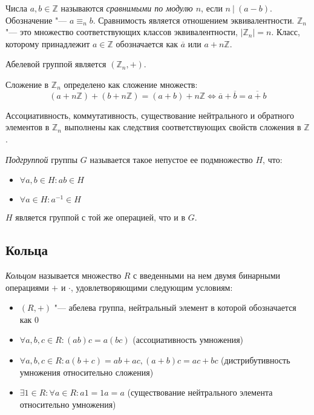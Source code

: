 \begin{definition}
	Числа $a, b \in \mathbb{Z}$ называются \textit{сравнимыми по модулю $n$}, если $n~|~(a - b)$. Обозначение "--- $a \equiv_n b$. Сравнимость является отношением эквивалентности. $\mathbb{Z}_n$ "--- это множество соответствующих классов эквивалентности, $|\mathbb{Z}_n| = n$. Класс, которому принадлежит $a \in \mathbb{Z}$ обозначается как $\overline{a}$ или $a + n\mathbb{Z}$.
\end{definition}

\begin{example}
	Абелевой группой является $(\mathbb{Z}_n, +)$.
	
	Сложение в $\mathbb{Z}_n$ определено как сложение множеств:
	\[(a + n\mathbb{Z}) + (b + n\mathbb{Z}) = (a + b) + n\mathbb{Z} \Leftrightarrow \overline{a} + \overline{b} = \overline{a + b}\]
	
	Ассоциативность, коммутативность, существование нейтрального и обратного элементов в $\mathbb{Z}_n$ выполнены как следствия соответствующих свойств сложения в $\mathbb{Z}$.
\end{example}

\begin{definition}
	\textit{Подгруппой} группы $G$ называется такое непустое ее подмножество $H$, что:
	\begin{itemize}
		\item $\forall a, b \in H: ab \in H$
		\item $\forall a \in H : a^{-1} \in H$
	\end{itemize}
	
	$H$ является группой с той же операцией, что и в $G$.
\end{definition}

\subsection{Кольца}

\begin{definition}
	\textit{Кольцом} называется множество $R$ с введенными на нем двумя бинарными операциями $+$ и $\cdot$, удовлетворяющими следующим условиям:
	\begin{itemize}
		\item $(R, +)$ "--- абелева группа, нейтральный элемент в которой обозначается как $0$
		\item $\forall a, b, c \in R: (ab)c = a(bc)$ (ассоциативность умножения)
		\item $\forall a, b, c \in R: a(b + c) = ab + ac, (a + b)c = ac + bc$ (дистрибутивность умножения относительно сложения)
		\item $\exists 1 \in R: \forall a \in R: a1 = 1a = a$ (существование нейтрального элемента относительно умножения)
	\end{itemize}
\end{definition}

